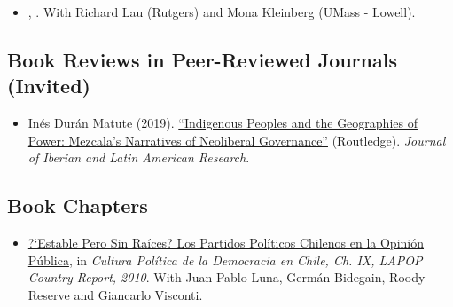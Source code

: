 \begin{itemize}
  	\item[\textcolor{gray}{\textbullet}] \href{https://raw.githubusercontent.com/hbahamonde/Running_Tally/master/abstract.txt}{\unskip}, {\bf \emph{\unskip}}. With Richard Lau (Rutgers) and Mona Kleinberg (UMass - Lowell). 






\end{itemize}




\subsection*{Book Reviews in Peer-Reviewed Journals (Invited)}

\begin{itemize}
	\item[\textcolor{gray}{\textbullet}] In\'es Dur\'an Matute (2019). \href{https://doi.org/10.1080/13260219.2019.1671679}{``Indigenous Peoples and the Geographies of Power: Mezcala's Narratives of Neoliberal Governance''} (Routledge). \emph{Journal of Iberian and Latin American Research}. %
\end{itemize}

\subsection*{Book Chapters}

\begin{itemize}
\item[\textcolor{gray}{\textbullet}] \href{http://www.vanderbilt.edu/lapop/chile/Chile-2010-cultura-politica.pdf}{?`Estable Pero Sin Ra\'ices? Los Partidos Pol\'iticos Chilenos en la Opini\'on P\'ublica}, in \emph{Cultura Pol\'itica de la Democracia en Chile, Ch. IX, LAPOP Country Report, 2010}. With Juan Pablo Luna, Germ\'an Bidegain, Roody Reserve and Giancarlo Visconti.
\end{itemize}




